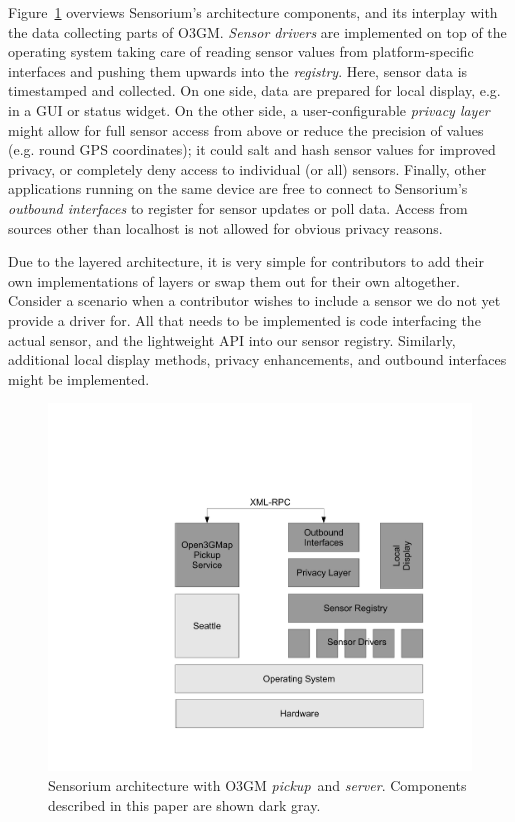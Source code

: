 Figure~\ref{c5:fig:architecture} overviews Sensorium's architecture components, and its interplay with the data collecting parts of O3GM. \textit{Sensor drivers} are implemented on top of the operating system taking care of reading sensor values from platform-specific interfaces and pushing them upwards into the \textit{registry}. Here, sensor data is timestamped and collected. On one side, data are prepared for local display, e.g. in a GUI or status widget. On the other side, a user-configurable \textit{privacy layer} might allow for full sensor access from above or reduce the precision of values (e.g. round GPS coordinates); it could salt and hash sensor values for improved privacy, or completely deny access to individual (or all) sensors. Finally, other applications running on the same device are free to connect to Sensorium's \textit{outbound interfaces} to register for sensor updates or poll data. Access from sources other than localhost is not allowed for obvious privacy reasons.

Due to the layered architecture, it is very simple for contributors to add their own implementations of layers or swap them out for their own altogether. Consider a scenario when a contributor wishes to include a sensor we do not yet provide a driver for. All that needs to be implemented is code interfacing the actual sensor, and the lightweight API into our sensor registry. Similarly, additional local display methods, privacy enhancements, and outbound interfaces might be implemented.

\begin{figure}[t!]
\centering
\includegraphics[width=0.85\columnwidth]{images/architecture.pdf}
\caption{\small Sensorium architecture with O3GM \textit{pickup}~and \textit{server}. Components described in this paper are shown dark gray.}
\label{c5:fig:architecture}
\end{figure}

